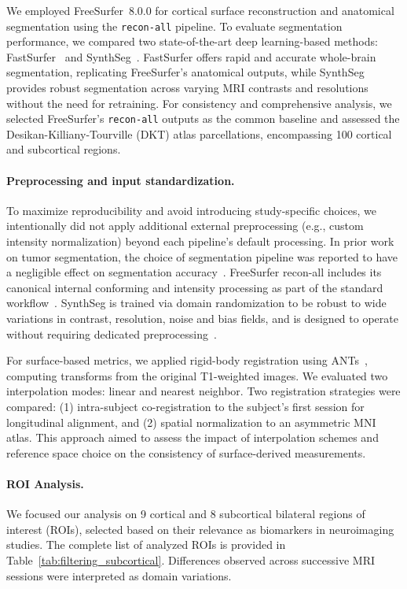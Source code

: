 \documentclass{midl} %
\begin{document}
We employed FreeSurfer~8.0.0 for cortical surface reconstruction and anatomical segmentation using the \texttt{recon-all} pipeline. To evaluate segmentation performance, we compared two state-of-the-art deep learning-based methods: FastSurfer~\cite{Henschel2020FastSurfer} and SynthSeg~\cite{Billot2023SynthSeg}. FastSurfer offers rapid and accurate whole-brain segmentation, replicating FreeSurfer's anatomical outputs, while SynthSeg provides robust segmentation across varying MRI contrasts and resolutions without the need for retraining. For consistency and comprehensive analysis, we selected FreeSurfer's \texttt{recon-all} outputs as the common baseline and assessed the Desikan-Killiany-Tourville (DKT) atlas parcellations, encompassing 100 cortical and subcortical regions.

\paragraph{Preprocessing and input standardization.} To maximize reproducibility and avoid introducing study-specific choices, we intentionally did not apply additional external preprocessing (e.g., custom intensity normalization) beyond each pipeline's default processing. In prior work on tumor segmentation, the choice of segmentation pipeline was reported to have a negligible effect on segmentation accuracy~\cite{kondrateva2024negligible}. FreeSurfer recon-all includes its canonical internal conforming and intensity processing as part of the standard workflow~\citep{Fischl2012FS}. SynthSeg is trained via domain randomization to be robust to wide variations in contrast, resolution, noise and bias fields, and is designed to operate without requiring dedicated preprocessing~\citep{Billot2023SynthSeg}.

For surface-based metrics, we applied rigid-body registration using ANTs~\cite{Avants2011}, computing transforms from the original T1-weighted images. We evaluated two interpolation modes: linear and nearest neighbor. Two registration strategies were compared: (1) intra-subject co-registration to the subject's first session for longitudinal alignment, and (2) spatial normalization to an asymmetric MNI atlas. This approach aimed to assess the impact of interpolation schemes and reference space choice on the consistency of surface-derived measurements.

\paragraph{ROI Analysis.} We focused our analysis on 9 cortical and 8 subcortical bilateral regions of interest (ROIs), selected based on their relevance as biomarkers in neuroimaging studies. The complete list of analyzed ROIs is provided in Table~\ref{tab:filtering_subcortical}. Differences observed across successive MRI sessions were interpreted as domain variations. 
\end{document}
